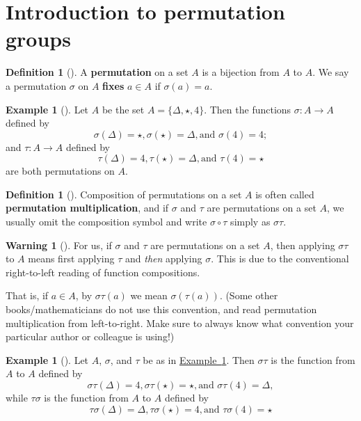 \documentclass[10pt,]{book}
\newcommand{\terminology}[1]{\textbf{#1}}
\theoremstyle{plain}
\theoremstyle{definition}
\newtheorem{definition}[theorem]{Definition}
\theoremstyle{definition}
\newtheorem{warning}[theorem]{Warning}
\theoremstyle{definition}
\newtheorem{example}[theorem]{Example}
\theoremstyle{definition}
\numberwithin{equation}{section}
\begin{document}
\section[{Introduction to permutation groups}]{Introduction to permutation groups}\label{permutationgps}
\begin{definition}[{}]\label{definition-43}
A \terminology{permutation} on a set \(A\) is a bijection from \(A\) to \(A\). We say a permutation \(\sigma\) on \(A\) \terminology{fixes} \(a\in
A\) if \(\sigma(a)=a\).%
\end{definition}
\begin{example}[]\label{stperm}
Let \(A\) be the set \(A=\{\Delta, \star, 4\}\). Then the functions \(\sigma : A\to A\) defined by%
\begin{equation*}
\sigma(\Delta)=\star,
\sigma(\star)=\Delta,  \text{and }  \sigma(4)=4;
\end{equation*}
and \(\tau : A\to A\) defined by%
\begin{equation*}
\tau(\Delta)=4, 
\tau(\star)=\Delta,  \text{and }  \tau(4)=\star
\end{equation*}
are both permutations on \(A\).%
\end{example}
\begin{definition}[{}]\label{definition-44}
Composition of permutations on a set \(A\) is often called \terminology{permutation multiplication}, and if \(\sigma\) and \(\tau\) are permutations on a set \(A\), we usually omit the composition symbol and write \(\sigma \circ \tau\) simply as \(\sigma \tau\).%
\end{definition}
\begin{warning}[]\label{warning-16}
For us, if \(\sigma\) and \(\tau\) are permutations on a set \(A\), then applying \(\sigma \tau\) to \(A\) means first applying \(\tau\) and \emph{then} applying \(\sigma\). This is due to the conventional right-to-left reading of function compositions.%
\end{warning}
That is, if \(a\in A\), by \(\sigma \tau(a)\) we mean \(\sigma(\tau(a))\). (Some other books/mathematicians do not use this convention, and read permutation multiplication from left-to-right. Make sure to always know what convention your particular author or colleague is using!)%
\begin{example}[]\label{example-50}
Let \(A\), \(\sigma\), and \(\tau\) be as in \hyperref[stperm]{Example~\ref{stperm}}. Then \(\sigma \tau\) is the function from \(A\) to \(A\) defined by%
\begin{equation*}
\sigma \tau(\Delta)=4,  \sigma \tau(\star)=\star,  \text{and }  \sigma \tau(4)=\Delta,
\end{equation*}
while \(\tau \sigma\) is the function from \(A\) to \(A\) defined by%
\begin{equation*}
\tau \sigma (\Delta)=\Delta,  \tau \sigma (\star)=4,  \text{and }  \tau \sigma(4)=\star
\end{equation*}
%
\end{example}
\end{document}
